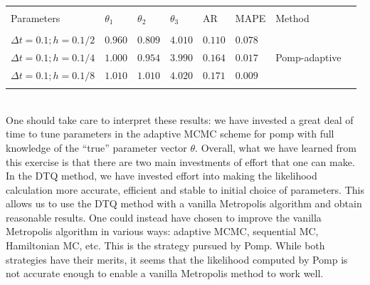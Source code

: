 \documentclass[graybox]{svmult}
\begin{document}
\begin{table}[!htbp] \centering 

\begin{tabular}{llllllll} 
\\[-1.8ex]\hline 
\hline \\[-1.8ex] 
Parameters & $\theta_1$ & $\theta_2$ & $\theta_3$ & AR & MAPE & Method \\ 
\hline \\[-1.8ex] 
$\Delta t = 0.1; h = 0.1/2$ & $0.960$ & $0.809$ & $4.010$ & $0.110$ & $0.078$ & \\ 
$\Delta t = 0.1; h = 0.1/4$ & $1.000$ & $0.954$ & $3.990$ & $0.164$ & $0.017$ & Pomp-adaptive \\ 
$\Delta t = 0.1; h = 0.1/8$ & $1.010$ & $1.010$ & $4.020$ & $0.171$ & $0.009$ & \\ 
\hline \\[-1.8ex] 
\end{tabular} 
\end{table} 
\vspace{-5mm}
\\
One should take care to interpret these results: we have invested a great
deal of time to tune parameters in the adaptive MCMC scheme for pomp with
full knowledge of the ``true'' parameter vector $\theta$.  Overall, what
we have learned from this exercise is that there are two main investments
of effort that one can make.  In the DTQ method, we have invested effort into
making the likelihood calculation more accurate, efficient and stable to initial choice of parameters.  This allows us to use the DTQ method with a vanilla
Metropolis algorithm and obtain reasonable results.  One could instead have
chosen to improve the vanilla Metropolis algorithm in various ways: adaptive
MCMC, sequential MC, Hamiltonian MC, etc.  This is
the strategy pursued by Pomp. While both strategies have their merits, 
it seems that the likelihood computed by Pomp is not accurate enough to
enable a vanilla Metropolis method to work well.
\end{document}
